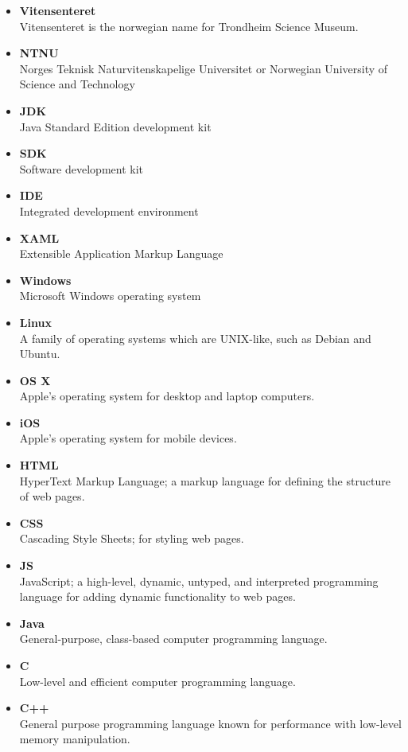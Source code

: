 \begin{itemize}
\item \textbf{Vitensenteret}\\
Vitensenteret is the norwegian name for Trondheim Science Museum.
\item \textbf{NTNU}\\
Norges Teknisk Naturvitenskapelige Universitet or Norwegian University of Science and Technology
\item \textbf{JDK}\\
Java Standard Edition development kit
\item \textbf{SDK}\\
Software development kit
\item \textbf{IDE}\\
Integrated development environment
\item \textbf{XAML}\\
Extensible Application Markup Language
\item \textbf{Windows}\\
Microsoft Windows operating system
\item \textbf{Linux}\\
A family of operating systems which are UNIX-like, such as Debian and Ubuntu.
\item \textbf{OS X}\\
Apple's operating system for desktop and laptop computers.
\item \textbf{iOS}\\
Apple's operating system for mobile devices.
\item \textbf{HTML}\\
HyperText Markup Language; a markup language for defining the structure of web pages.
\item \textbf{CSS}\\
Cascading Style Sheets; for styling web pages.
\item \textbf{JS}\\
JavaScript; a high-level, dynamic, untyped, and interpreted programming language for adding dynamic functionality to web pages.
\item \textbf{Java}\\
General-purpose, class-based computer programming language.
\item \textbf{C}\\
Low-level and efficient computer programming language.
\item \textbf{C++}\\
General purpose programming language known for performance with low-level memory manipulation.

\end{itemize}
